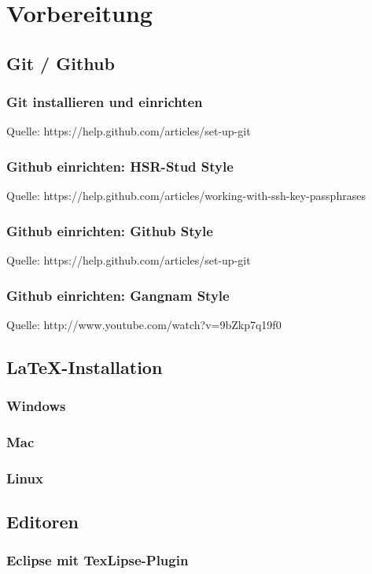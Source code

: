 \section{Vorbereitung}

\subsection{Git / Github}
\subsubsection{Git installieren und einrichten}
Quelle: https://help.github.com/articles/set-up-git
\subsubsection{Github einrichten: HSR-Stud Style}
Quelle: https://help.github.com/articles/working-with-ssh-key-passphrases
\subsubsection{Github einrichten: Github Style}
Quelle: https://help.github.com/articles/set-up-git
\subsubsection{Github einrichten: Gangnam Style}
Quelle: http://www.youtube.com/watch?v=9bZkp7q19f0 

\subsection{\LaTeX-Installation}
\subsubsection{Windows}
\subsubsection{Mac}
\subsubsection{Linux}


\subsection{Editoren}
\subsubsection{Eclipse mit TexLipse-Plugin}

